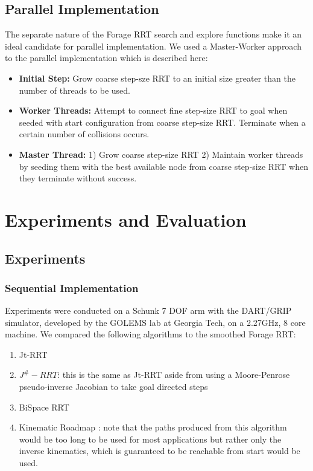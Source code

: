 \documentclass[conference]{IEEEtran}
\begin{document}
\subsection{Parallel Implementation}
The separate nature of the Forage RRT search and explore functions make it an ideal candidate for parallel implementation. We used a
Master-Worker approach to the parallel implementation which is described here:
\begin{itemize}
\item \textbf{Initial Step: } Grow coarse step-sze RRT to an initial size greater than the number of threads to be used.
\item \textbf{Worker Threads: } Attempt to connect fine step-size RRT to goal when seeded with start configuration from coarse step-size
RRT. Terminate when a certain number of collisions occurs.
\item \textbf{Master Thread: } 1) Grow coarse step-size RRT 2) Maintain worker threads by seeding them with the best available node from
coarse step-size RRT when they terminate without success.
\end{itemize}

\section{Experiments and Evaluation}
\label{sec:evaluation}
\subsection{Experiments}
\subsubsection{Sequential Implementation}
Experiments were conducted on a Schunk 7 DOF arm with the DART/GRIP simulator, developed by the GOLEMS lab at Georgia Tech, on a 2.27GHz, 8
core machine. We compared the following algorithms to the smoothed Forage RRT:
\begin{enumerate}
	\item Jt-RRT \cite{vande07}
	\item $J^{\#}-RRT$: this is the same as Jt-RRT aside from using a Moore-Penrose pseudo-inverse Jacobian to take
	      goal directed steps
	\item BiSpace RRT \cite{diankov08}
	\item Kinematic Roadmap \cite{ahuactzin99}: note that the paths produced from this algorithm would be too long to be used for most
	      applications but rather only the inverse kinematics, which is guaranteed to be reachable from start would be used.
\end{enumerate}
\end{document}
